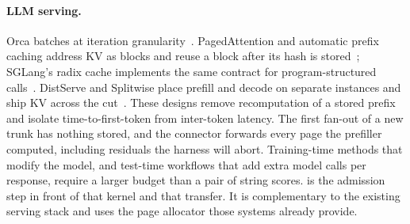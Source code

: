 \paragraph{LLM serving.}
Orca batches at iteration granularity~\citep{orca}.
PagedAttention and automatic prefix caching address KV as blocks and reuse a block after its hash is stored~\citep{vllm}; SGLang's radix cache implements the same contract for program-structured calls~\citep{sglang}.
DistServe and Splitwise place prefill and decode on separate instances and ship KV across the cut~\citep{distserve,splitwise}.
These designs remove recomputation of a stored prefix and isolate time-to-first-token from inter-token latency.
The first fan-out of a new trunk has nothing stored, and the connector forwards every page the prefiller computed, including residuals the harness will abort.
Training-time methods that modify the model, and test-time workflows that add extra model calls per response, require a larger budget than a pair of string scores.
\sys is the admission step in front of that kernel and that transfer.
It is complementary to the existing serving stack and uses the page allocator those systems already provide.
